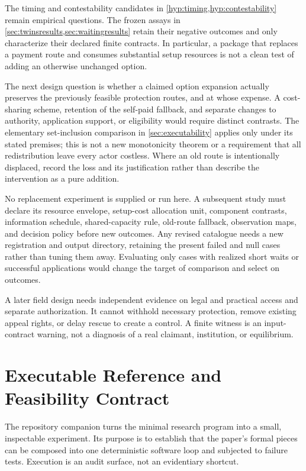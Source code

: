 \documentclass[11pt,a4paper]{article}
\numberwithin{equation}{section}
\theoremstyle{definition}
\theoremstyle{plain}
\theoremstyle{remark}
\begin{document}
The timing and contestability candidates in \cref{hyp:timing,hyp:contestability} remain empirical questions. The frozen assays in \cref{sec:twinsresults,sec:waitingresults} retain their negative outcomes and only characterize their declared finite contracts. In particular, a package that replaces a payment route and consumes substantial setup resources is not a clean test of adding an otherwise unchanged option.

The next design question is whether a claimed option expansion actually preserves the previously feasible protection routes, and at whose expense. A cost-sharing scheme, retention of the self-paid fallback, and separate changes to authority, application support, or eligibility would require distinct contrasts. The elementary set-inclusion comparison in \cref{sec:executability} applies only under its stated premises; this is not a new monotonicity theorem or a requirement that all redistribution leave every actor costless. Where an old route is intentionally displaced, record the loss and its justification rather than describe the intervention as a pure addition.

No replacement experiment is supplied or run here. A subsequent study must declare its resource envelope, setup-cost allocation unit, component contrasts, information schedule, shared-capacity rule, old-route fallback, observation maps, and decision policy before new outcomes. Any revised catalogue needs a new registration and output directory, retaining the present failed and null cases rather than tuning them away. Evaluating only cases with realized short waits or successful applications would change the target of comparison and select on outcomes.

A later field design needs independent evidence on legal and practical access and separate authorization. It cannot withhold necessary protection, remove existing appeal rights, or delay rescue to create a control. A finite witness is an input-contract warning, not a diagnosis of a real claimant, institution, or equilibrium.

\section{Executable Reference and Feasibility Contract}

The repository companion turns the minimal research program into a small, inspectable experiment. Its purpose is to establish that the paper's formal pieces can be composed into one deterministic software loop and subjected to failure tests. Execution is an audit surface, not an evidentiary shortcut.
\end{document}
